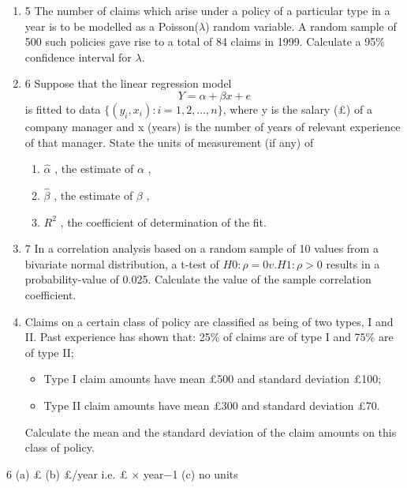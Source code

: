 \documentclass[a4paper,12pt]{article}
\begin{document}
\begin{enumerate}
\item 5 The number of claims which arise under a policy of a particular type in a year is
to be modelled as a Poisson($\lambda$) random variable. A random sample of 500 such policies gave rise to a total of 84 claims in 1999.
Calculate a 95\% confidence interval for $\lambda$. 
\item 6 Suppose that the linear regression model
\[Y = \alpha + \beta x + e\]
is fitted to data $\{(y_i , x_i) : i = 1, 2, \ldots , n\}$, where y is the salary (£) of a company
manager and x (years) is the number of years of relevant experience of that
manager.
State the units of measurement (if any) of
\begin{enumerate}
    \item  $\hat{\alpha}$ , the estimate of $\alpha$ ,
\item $\hat{\beta}$ , the estimate of $\beta$ ,
\item $R^2$ , the coefficient of determination of the fit. 
\end{enumerate}

\newpage

\item 7 In a correlation analysis based on a random sample of 10 values from a bivariate
normal distribution, a t-test of
$H0 : \rho = 0 v. H1 : \rho > 0$
results in a probability-value of 0.025.
Calculate the value of the sample correlation coefficient. 
\newpage
\item  Claims on a certain class of policy are classified as being of two types, I and II.
Past experience has shown that:
25\% of claims are of type I and 75\% are of type II;
\begin{itemize}
    \item Type I claim amounts have mean £500 and standard deviation £100;
\item Type II claim amounts have mean £300 and standard deviation £70.
\end{itemize}

Calculate the mean and the standard deviation of the claim amounts on this
class of policy. 
\end{enumerate}
6 (a) £
(b) £/year i.e. £ × year−1
(c) no units
\end{document}
